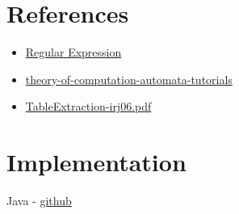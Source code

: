 \documentclass{article}
\begin{document}
\section{References}
\begin{itemize}
    \item \hyperlink{https://en.wikipedia.org/wiki/Regular_expression}{Regular Expression}
    \item \hyperlink{https://www.geeksforgeeks.org/theory-of-computation-automata-tutorials/?ref=lbp}{theory-of-computation-automata-tutorials}
    \item \hyperlink{https://people.cs.umass.edu/~mccallum/papers/TableExtraction-irj06.pdf}{TableExtraction-irj06.pdf}
\end{itemize}

\section{Implementation}

Java - \hyperlink{https://github.com/RomualdRousseau/Any2Json}{github}
\end{document}

